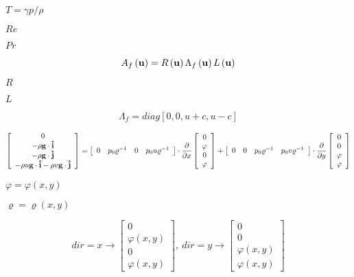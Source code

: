 \documentclass{article}
\begin{document}
$T = \gamma p/\rho$
\pagebreak

$Re$
\pagebreak

$Pr$
\pagebreak

\begin{equation} A_f\left({\bf u}\right) = R\left({\bf u}\right)\Lambda_f\left({\bf u}\right)L\left({\bf u}\right) \end{equation}
\pagebreak

$R$
\pagebreak

$L$
\pagebreak

\begin{equation} \Lambda_f = diag\left[0,0,u+c,u-c \right] \end{equation}
\pagebreak

\begin{equation} \left[\begin{array}{c} 0 \\ -\rho {\bf g}\cdot{\bf \hat{i}} \\ -\rho {\bf g}\cdot{\bf \hat{j}} \\ -\rho u {\bf g}\cdot{\bf \hat{i}} - \rho v {\bf g}\cdot{\bf \hat{j}} \end{array}\right] = \left[\begin{array}{cccc} 0 & p_0 \varrho^{-1} & 0 & p_0 u \varrho^{-1} \end{array}\right] \cdot \frac{\partial}{\partial x}\left[\begin{array}{c} 0 \\ \varphi \\ 0 \\ \varphi \end{array}\right] + \left[\begin{array}{cccc} 0 & 0 & p_0 \varrho^{-1} & p_0 v \varrho^{-1} \end{array}\right] \cdot \frac{\partial}{\partial y}\left[\begin{array}{c} 0 \\ 0 \\ \varphi \\ \varphi \end{array}\right] \end{equation}
\pagebreak

$\varphi = \varphi\left(x,y\right)$
\pagebreak

$\varrho = \varrho\left(x,y\right)$
\pagebreak

\begin{equation} dir = x \rightarrow \left[\begin{array}{c}0 \\ \varphi\left(x,y\right) \\ 0 \\ \varphi\left(x,y\right) \end{array}\right], \ dir = y \rightarrow \left[\begin{array}{c}0 \\ 0 \\ \varphi\left(x,y\right) \\ \varphi\left(x,y\right) \end{array}\right] \end{equation}
\pagebreak
\end{document}

